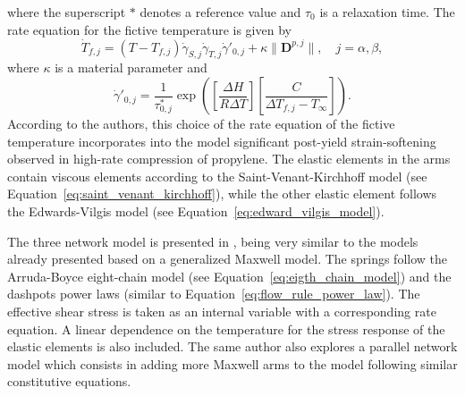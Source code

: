 where the superscript $*$ denotes a reference value and $\tau_0$ is a relaxation time.
The rate equation for the fictive temperature is given by
\begin{equation}
	\dot T_{f,j} = (T - T_{f,j})\dot\gamma_{S,j}\dot\gamma_{T,j}\dot\gamma'_{0,j} + \kappa \|\mathbf D^{p,j}\|,\quad j = \alpha, \beta,
\end{equation}
where $\kappa$ is a material parameter and
\begin{equation}
	\dot \gamma'_{0,j} = \frac{1}{\tau^*_{0,j}} \exp\left(\left[\frac{\Delta H}{R\Delta T}\right]\left[\frac{C}{\Delta T_{f,j} - T_\infty}\right]\right).
\end{equation}
According to the authors, this choice of the rate equation of the fictive temperature incorporates into the model significant post-yield strain-softening observed in high-rate compression of propylene.
The elastic elements in the arms contain viscous elements according to the Saint-Venant-Kirchhoff model (see Equation~\eqref{eq:saint_venant_kirchhoff}), while the other elastic element follows the Edwards-Vilgis model (see Equation~\eqref{eq:edward_vilgis_model}).

The three network model is presented in \citep{bergstromMechanicsSolidPolymers2015}, being very similar to the models already presented based on a generalized Maxwell model.
The springs follow the Arruda-Boyce eight-chain model (see Equation~\eqref{eq:eigth_chain_model}) and the dashpots power laws (similar to Equation~\eqref{eq:flow_rule_power_law}).
The effective shear stress is taken as an internal variable with a corresponding rate equation.
A linear dependence on the temperature for the stress response of the elastic elements is also included.
The same author also explores a parallel network model which consists in adding more Maxwell arms to the model following similar constitutive equations.

